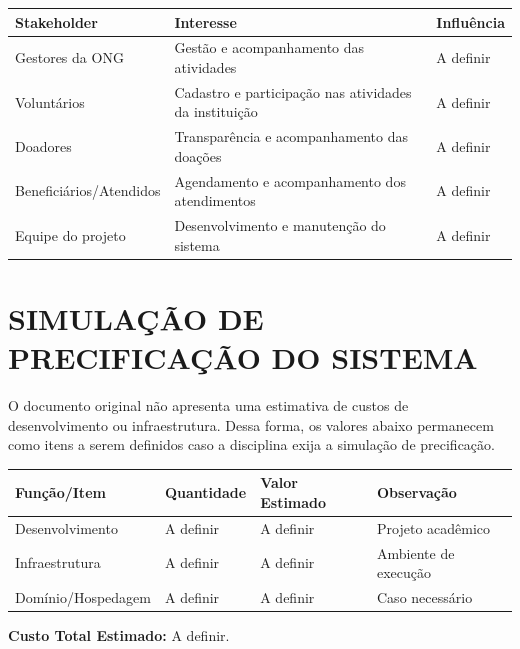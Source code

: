 \documentclass[12pt,a4paper]{article}
\begin{document}
\begin{center}
\begin{tabularx}{\textwidth}{P{4cm}Y P{2cm}}
\toprule
\textbf{Stakeholder} & \textbf{Interesse} & \textbf{Influência}\\
\midrule
Gestores da ONG & Gestão e acompanhamento das atividades & A definir\\
Voluntários & Cadastro e participação nas atividades da instituição & A definir\\
Doadores & Transparência e acompanhamento das doações & A definir\\
Beneficiários/Atendidos & Agendamento e acompanhamento dos atendimentos & A definir\\
Equipe do projeto & Desenvolvimento e manutenção do sistema & A definir\\
\bottomrule
\end{tabularx}
\end{center}


\section*{SIMULAÇÃO DE PRECIFICAÇÃO DO SISTEMA}

O documento original não apresenta uma estimativa de custos de
desenvolvimento ou infraestrutura. Dessa forma, os valores abaixo
permanecem como itens a serem definidos caso a disciplina exija a
simulação de precificação.

\begin{center}
\begin{tabularx}{\textwidth}{P{4cm}P{3cm}P{3cm}Y}
\toprule
\textbf{Função/Item} & \textbf{Quantidade} &
\textbf{Valor Estimado} & \textbf{Observação}\\
\midrule
Desenvolvimento & A definir & A definir & Projeto acadêmico\\
Infraestrutura & A definir & A definir & Ambiente de execução\\
Domínio/Hospedagem & A definir & A definir & Caso necessário\\
\bottomrule
\end{tabularx}
\end{center}

\textbf{Custo Total Estimado:} A definir.

\end{document}
